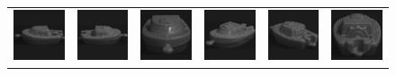 \begin{figure}[p]
\begin{center}
\begin{tabular}{cccccc}
\includegraphics[width=2cm]{coil/beeld-24.eps} &
\includegraphics[width=2cm]{coil/beeld-25.eps} &
\includegraphics[width=2cm]{coil/beeld-26.eps} &
\includegraphics[width=2cm]{coil/beeld-27.eps} &
\includegraphics[width=2cm]{coil/beeld-28.eps} &
\includegraphics[width=2cm]{coil/beeld-29.eps} \\


\end{tabular}
\end{center}
\end{figure}
